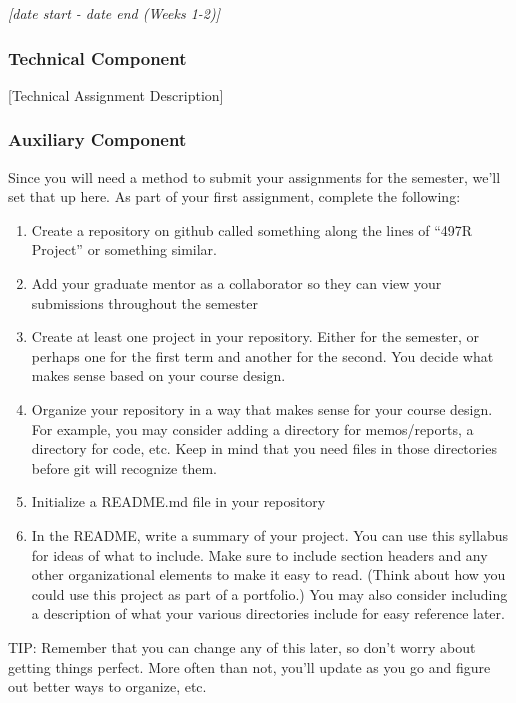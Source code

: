 \documentclass[12pt]{article}
\begin{document}
\textit{[date start - date end (Weeks 1-2)]}
 
 
\subsubsection{Technical Component}
\label{sssec:a1t}

[Technical Assignment Description]


\subsubsection{Auxiliary Component}
\label{sssec:a1a}

Since you will need a method to submit your assignments for the semester, we'll set that up here.  As part of your first assignment, complete the following:

\begin{enumerate}
	\item Create a repository on github called something along the lines of ``497R Project'' or something similar.
	\item Add your graduate mentor as a collaborator so they can view your submissions throughout the semester
	\item Create at least one project in your repository. Either for the semester, or perhaps one for the first term and another for the second. You decide what makes sense based on your course design.
	\item Organize your repository in a way that makes sense for your course design. For example, you may consider adding a directory for memos/reports, a directory for code, etc.  Keep in mind that you need files in those directories before git will recognize them.
	\item Initialize a README.md file in your repository
	\item In the README, write a summary of your project.  You can use this syllabus for ideas of what to include.  Make sure to include section headers and any other organizational elements to make it easy to read. (Think about how you could use this project as part of a portfolio.) You may also consider including a description of what your various directories include for easy reference later.
\end{enumerate}

TIP:  Remember that you can change any of this later, so don't worry about getting things perfect.  More often than not, you'll update as you go and figure out better ways to organize, etc.
\end{document}
